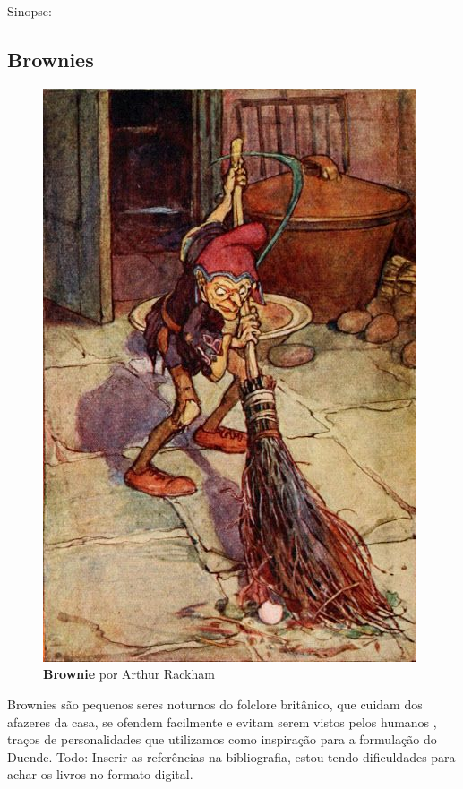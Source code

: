 Sinopse:

\subsection{Brownies}

\begin{figure}[htb]
	\caption{\label{fig_grafico}\textbf{Brownie} por Arthur Rackham }
	\begin{center}
	    \includegraphics[width=\textwidth/2]{imagens/brownie.jpg}
		\end{center}
\end{figure}

Brownies são pequenos seres noturnos do folclore britânico, que cuidam dos afazeres da casa, se ofendem facilmente e evitam serem vistos pelos humanos \cite{britannica_2011}, traços de personalidades que utilizamos como inspiração para a formulação do Duende.
Todo: Inserir as referências na bibliografia, estou tendo dificuldades para achar os livros no formato digital.

